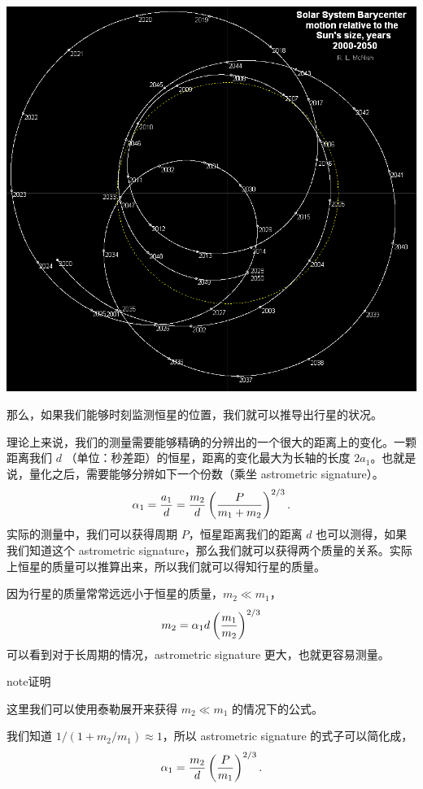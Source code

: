 \documentclass[letterpaper,10pt,english]{sphinxmanual}
\begin{document}
{\hfill\includegraphics{Solar_System_Barycenter_2000-2050.png}\hfill}

那么，如果我们能够时刻监测恒星的位置，我们就可以推导出行星的状况。

理论上来说，我们的测量需要能够精确的分辨出的一个很大的距离上的变化。一颗距离我们 \(d\) （单位：秒差距）的恒星，距离的变化最大为长轴的长度 \(2a_1\)。也就是说，量化之后，需要能够分辨如下一个份数（乘坐 astrometric signature）。
\begin{gather}
\begin{split}\alpha_1 = \frac{a_1}{d} = \frac{m_2}{d}\left(\frac{P}{m_1+m_2}\right)^{2/3}.\end{split}\notag
\end{gather}
实际的测量中，我们可以获得周期 \(P\)，恒星距离我们的距离 \(d\) 也可以测得，如果我们知道这个 astrometric signature，那么我们就可以获得两个质量的关系。实际上恒星的质量可以推算出来，所以我们就可以得知行星的质量。

因为行星的质量常常远远小于恒星的质量，\(m_2\ll m_1\)，
\begin{gather}
\begin{split}m_2 = \alpha_1 d \left(\frac{m_1}{m_2}\right)^{2/3}\end{split}\notag
\end{gather}
可以看到对于长周期的情况，astrometric signature 更大，也就更容易测量。

\begin{notice}{note}{证明}

这里我们可以使用泰勒展开来获得 \(m_2\ll m_1\) 的情况下的公式。

我们知道 \(1/(1+m_2/m_1)\approx 1\)，所以 astrometric signature 的式子可以简化成，
\begin{gather}
\begin{split}\alpha_1 = \frac{m_2}{d} \left(\frac{P}{m_1}\right)^{2/3}.\end{split}\notag
\end{gather}\end{notice}
\end{document}
